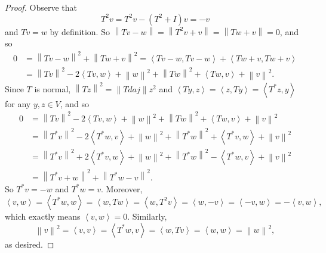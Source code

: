 \documentclass[linearalgebra]{subfiles}
\begin{document}
    \begin{proof}
        Observe that
        \begin{equation*}
            T^{2} v = T^{2} v - \left( T^{2} +I \right) v = -v
        \end{equation*}
        and $Tv = w$ by definition. So $\left\lVert Tv-w\right\rVert  = \left\lVert T^{2} v+v\right\rVert = \left\lVert Tw+v\right\rVert = 0$, and so
        \begin{align*}
            0 & = \left\lVert Tv-w\right\rVert ^{2} + \left\lVert Tw+v\right\rVert ^{2} = \left\langle Tv-w, Tv-w\right\rangle + \left\langle Tw+v, Tw+v\right\rangle \\
              & = \left\lVert Tv\right\rVert ^{2} - 2\left\langle Tv, w\right\rangle + \left\lVert w\right\rVert ^{2} + \left\lVert Tw\right\rVert ^{2} + \left\langle Tw,v \right\rangle + \left\lVert v\right\rVert ^{2} .
        \end{align*} 
        Since $T$ is normal, $\left\lVert Tz\right\rVert ^{2} = \left\lVert Tdaj\right\rVert z  ^{2}$ and $\left\langle Ty, z\right\rangle = \left\langle z, Ty\right\rangle = \left\langle T^{*} z, y\right\rangle$ for any $y,z\in V$, and so
        \begin{align*}
              0 & = \left\lVert Tv\right\rVert ^{2} - 2\left\langle Tv, w\right\rangle + \left\lVert w\right\rVert ^{2} + \left\lVert Tw\right\rVert ^{2} + \left\langle Tw,v \right\rangle + \left\lVert v\right\rVert ^{2} \\
                & = \left\lVert T^{*} v\right\rVert ^{2} - 2\left\langle T^{*} w, v\right\rangle + \left\lVert w\right\rVert ^{2} + \left\lVert T^{*} w\right\rVert ^{2} + \left\langle T^{*} v,w \right\rangle + \left\lVert v\right\rVert ^{2} \\
                & = \left\lVert T^{*} v\right\rVert ^{2} + 2\left\langle T^{*} v, w\right\rangle + \left\lVert w\right\rVert ^{2} + \left\lVert T^{*} w\right\rVert ^{2} - \left\langle T^{*} w,v \right\rangle + \left\lVert v\right\rVert ^{2} \\
                & = \left\lVert T^{*} v+w\right\rVert ^{2} + \left\lVert T^{*} w-v\right\rVert ^{2} .
        \end{align*} 
        So $T^{*} v = -w$ and $T^{*} w = v$. Moreover,
        \begin{equation*}
            \left\langle v, w\right\rangle = \left\langle T^{*} w, w\right\rangle = \left\langle w, Tw\right\rangle = \left\langle w, T^{2} v\right\rangle = \left\langle w, -v\right\rangle = \left\langle -v, w\right\rangle = -\left\langle v, w\right\rangle ,
        \end{equation*}
        which exactly means $\left\langle v, w\right\rangle = 0$. Similarly,
        \begin{equation*}
            \left\lVert v\right\rVert ^{2} = \left\langle v, v\right\rangle= \left\langle T^{*} w, v\right\rangle = \left\langle w, Tv\right\rangle = \left\langle w, w\right\rangle = \left\lVert w\right\rVert ^{2} , 
        \end{equation*}
        as desired.
    \end{proof}
\end{document}
